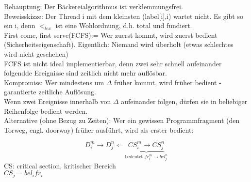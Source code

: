 \documentclass[a4paper,12pt]{scrartcl}
\begin{document}
Behauptung: Der Bäckereialgorithmus ist verklemmungsfrei.\\
Beweisskizze: Der Thread i mit dem kleinsten (label[i],i) wartet nicht. Es gibt so ein i, denn $<_{lex}$ ist eine Wohlordnung, d.h. total und fundiert.\\

First come, first serve(FCFS):= Wer zuerst kommt, wird zuerst bedient (Sicherheitseigenschaft). Eigentlich: Niemand wird überholt (etwas schlechtes wird nicht geschehen)\\
FCFS ist nicht ideal implementierbar, denn zwei sehr schnell aufeinander folgendde Ereignisse sind zeitlich nicht mehr auflösbar.\\
Kompromiss: Wer mindestens um $\Delta$ früher kommt, wird früher bedient - garantierte zeitliche Auflösung.\\
Wenn zwei Ereignisse innerhalb von $\Delta$ aufeinander folgen, dürfen sie in beliebiger Reihenfolge bedient werden.\\
Alternative (ohne Bezug zu Zeiten): Wer ein gewissen Programmfragment (den Torweg, engl. doorway) früher ausführt, wird als erster bedient:

$$D_i^m\to D_j^n \Leftarrow \underbrace{CS_i^m \to CS_j^n}_{\text{bedeutet }fr_i^m\to bel_j^n}$$ 
CS: critical section, kritischer Bereich\\
$CS_j = bel_i fr_i$\\
\end{document}
